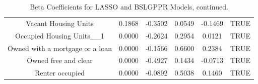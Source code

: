 \documentclass{article} %
\begin{document}
\begin{table}[H]
\begin{adjustbox}{width = 0.8\textwidth}
\begin{tabular}{cccccc}
  Vacant Housing Units & 0.1868 & -0.3502 & 0.0549 & -0.1469 & TRUE \\ 
  Occupied Housing Units\_\_1 & 0.0000 & -0.2624 & 0.2954 & 0.0121 & TRUE \\ 
  Owned with a mortgage or a loan & 0.0000 & -0.1566 & 0.6600 & 0.2384 & TRUE \\ 
  Owned free and clear & 0.0000 & -0.4927 & 0.1434 & -0.0713 & TRUE \\ 
  Renter occupied & 0.0000 & -0.0892 & 0.5038 & 0.1460 & TRUE \\ 
   \hline
\end{tabular}

\end{adjustbox}
\caption{Beta Coefficients for LASSO and BSLGPPR Models, continued.}
\label{table:betacoef2}
\end{table}
\end{document}
